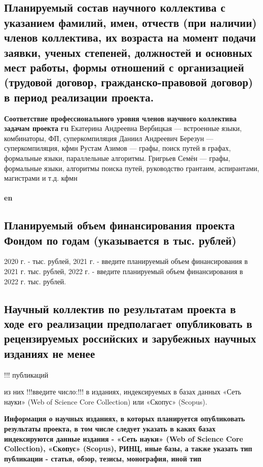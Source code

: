 \documentclass[12pt]{article}  %
\theoremstyle{remark}
\begin{document}
\subsection{Планируемый состав научного коллектива с указанием фамилий, имен, отчеств (при наличии) членов коллектива, их возраста на момент подачи заявки, ученых степеней, должностей и основных мест работы, формы отношений с организацией (трудовой договор, гражданско-правовой договор) в период реализации проекта.}


\textbf{Соответствие профессионального уровня членов научного коллектива задачам проекта}
\textbf{ru}
Екатерина Андреевна Вербицкая --- встроенные языки, комбинаторы, ФП, суперкомпиляция
Даниил Андреевич Березун --- суперкомпиляция, кфмн
Рустам Азимов --- графы, поиск путей в графах, формальные языки, параллельные алгоритмы.
Григрьев Семён --- графы, формальные языки, алгоритмы поиска путей, руководство грантаим, аспирантами, магистрами и т.д. кфмн
\\
\\
\textbf{en}

\subsection{Планируемый объем финансирования проекта Фондом по годам (указывается в тыс. рублей)}
2020 г. - тыс. рублей,
2021 г. - введите планируемый объем финансирования в 2021 г. тыс. рублей,
2022 г. - введите планируемый объем финансирования в 2022 г. тыс. рублей.

\subsection{Научный коллектив по результатам проекта в ходе его реализации предполагает опубликовать в рецензируемых российских и зарубежных научных изданиях не менее}

!!! публикаций

из них !!!введите число:!!! в изданиях, индексируемых в базах данных «Сеть науки» (Web of Science Core Collection) или «Скопус» (Scopus).

\textbf{Информация о научных изданиях, в которых планируется опубликовать результаты проекта, в том числе следует указать в каких базах индексируются данные издания - «Сеть науки» (Web of Science Core Collection), «Скопус» (Scopus), РИНЦ, иные базы, а также указать тип публикации - статья, обзор, тезисы, монография, иной тип}
\end{document}
